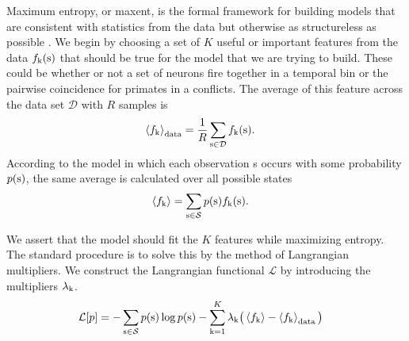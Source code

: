 \documentclass{jors}
\begin{document}
Maximum entropy, or maxent, is the formal framework for building models that are consistent with statistics from the data but otherwise as structureless as possible \cite{Bretthorst:2003ua,Jaynes:1957fy}.
We begin by choosing a set of $K$ useful or important features from the data $f_{\rm k}({\rm s})$ that should be true for the model that we are trying to build. These could be whether or not a set of neurons fire together in a temporal bin or the pairwise coincidence for primates in a conflicts. The average of this feature across the data set $\mathcal{D}$ with $R$ samples is
\begin{align}
	\left<f_{\rm k}\right>_{\rm data} &= \frac{1}{R}\sum_{{\rm s}\in \mathcal{D}} f_{\rm k}({\rm s}).
\end{align}
According to the model in which each observation s occurs with some probability $p(\rm s)$, the same average is calculated over all possible states
\begin{align}
	\left<f_{\rm k}\right> &= \sum_{\rm s\in\mathcal{S}} p({\rm s})f_{\rm k}({\rm s}).
\end{align}

We assert that the model should fit the $K$ features while maximizing entropy. The standard procedure is to solve this by the method of Langrangian multipliers. We construct the Langrangian functional $\mathcal{L}$ by introducing the multipliers $\lambda_{\rm k}$.
\begin{align}
	\mathcal{L}[p] &= -\sum_{\rm s\in\mathcal{S}} p({\rm s})\log p({\rm s}) - \sum_{\rm k=1}^{K} \lambda_{\rm k} \big(\left<f_{\rm k}\right>-\left<f_{\rm k}\right>_{\rm data}\big)\label{eq:Lagrang}
\end{align}


\end{document}
